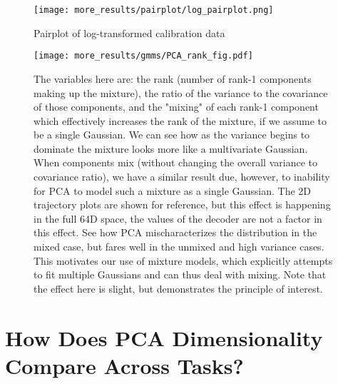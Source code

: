 \documentclass[../main.tex]{subfiles}
\begin{document}
\begin{figure}[H]%
  \centering
  \texttt{[image: more\_results/pairplot/log\_pairplot.png]}
  \caption[Pairplot of log-transformed calibration data]{Pairplot of log-transformed calibration data}\label{fig:log_pairplot}
\end{figure}

\begin{figure}[H]%
  \centering
    \texttt{[image: more\_results/gmms/PCA\_rank\_fig.pdf]}
    \caption[Explanatory Mixture Model]{The variables here are: the rank (number of rank-1 components making up the mixture), the ratio of the variance to the covariance of those components, and the "mixing" of each rank-1 component which effectively increases the rank of the mixture, if we assume to be a single Gaussian. We can see how as the variance begins to dominate the mixture looks more like a multivariate Gaussian. When components mix (without changing the overall variance to covariance ratio), we have a similar result due, however, to inability for PCA to model such a mixture as a single Gaussian. The 2D trajectory plots are shown for reference, but this effect is happening in the full 64D space, the values of the decoder are not a factor in this effect. See how PCA mischaracterizes the distribution in the mixed case, but fares well in the unmixed and high variance cases. This motivates our use of mixture models, which explicitly attempts to fit multiple Gaussians and can thus deal with mixing. Note that the effect here is slight, but demonstrates the principle of interest.}\label{fig:toy_model}
\end{figure}










\section{How Does PCA Dimensionality Compare Across Tasks?}
\end{document}
